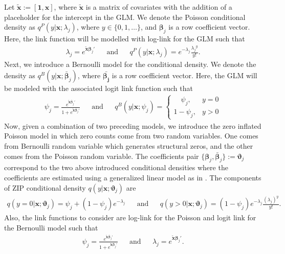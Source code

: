 \documentclass[11pt,letterpaper]{article}
\numberwithin{equation}{section}
\numberwithin{equation}{section}
\numberwithin{equation}{section}
\begin{document}
\newcommand{\xTilda}{\bm{\tilde{x}}}
Let $ \xTilda := [\bm{1},\bm{x}]$, where $\xTilda $ is a matrix of covariates with the addition of a placeholder for the intercept in the GLM. We denote the Poisson conditional density  as $ q^P(y|\bm{x}; \lambda_j) $, where $y \in \{0,1,\dots\}$, and  $\bm{\beta}_j$ is a row coefficient vector.
Here, the link function will be modelled with log-link for the GLM such that
 \begin{align*}
\lambda_j = e^{\xTilda \bm{\beta}_j'} && \text{and} & & %
q^P(y|\bm{ x} ; \lambda_{j} ) = e^{-\lambda_j} \frac{{\lambda_j}^y}{y!}.
 \end{align*}
Next, we introduce a Bernoulli model for the conditional density. We denote the density as  $ q^{B}(y|\bm{x}; \bm{\bar{\beta}}_j) $, where $\bm{\bar{\beta_j}}$ is a row coefficient vector.  Here, the GLM will be modeled with the associated logit link function such that
 \begin{align*}
 \psi_j =  \frac{e^{\xTilda \bm{\bar{\beta}}_j'}}{1+ e^{\xTilda  \bm{\bar{\beta}}_j'}}  && \text{and} && 
 q^B(y | \bm{x} ; {\psi}_j) = \begin{cases}
      \quad \psi_j, & y = 0\\
     1 -  \psi_j,  & y > 0
   \end{cases}
 \end{align*}
 Now, given a combination of two preceding models, we introduce the zero inflated Poisson model in which zero counts come from two random variables. One comes from Bernoulli random variable which generates structural zeros, and the other comes from the Poisson random variable. The coefficients pair $  \{ \bm{\beta}_{j},  \bm{\bar{\beta}}_j \} := \bm{\vartheta}_{j} $ correspond to the two above introduced conditional densities where the coefficients are estimated using a generalized linear model as in \cite{Lambert}. The components of ZIP conditional density $q(y|\bm{x}; \bm{\vartheta}_{j}  )$ are %
 \begin{align*}
 q( y = 0| \bm{x} ; \bm{ \vartheta}_{j}  ) = \psi_j + (1 - \psi_j)e^{-\lambda_j}  & &  \text{and}  & &
q(y > 0 |  \bm{x} ; \bm{ \vartheta}_{j}  ) = (1 - \psi_j)e^{-\lambda_j} \frac{\left(\lambda_j \right)^y  }{y!}.
 \end{align*}
Also, the link functions to consider are log-link for the Poisson and logit link for the Bernoulli model such that
 \begin{align*}
 \psi_j =  \frac{e^{\xTilda \bm{\bar{\beta}}_j'}}{1+ e^{\xTilda \bm{\bar{\beta}}_j'}}  & & \text{and} & &
\lambda_j  = e^{\xTilda \bm{\beta}_j'}.
 \end{align*}
\end{document}
